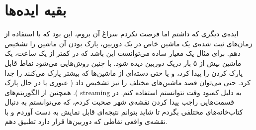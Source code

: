 \section{بقیه ایده‌ها}

ایده‌ی دیگری که داشتم اما فرصت نکردم سراغ آن بروم، این بود که با استفاده از زمان‌های ثبت شده‌ی یک ماشین خاص در یک دوربین، 
پارک بودن آن ماشین را تشخیص دهم. برای مثال یک معیار ساده می‌توانست این باشد که در کمتر از یک ساعت، یک ماشین بیش از ۵ بار دریک دوربین دیده شود. 
با چنین روش‌هایی می‌شود نقاط قابل پارک کردن را پیدا کرد، و یا حتی دسته‌ای از ماشین‌ها که بیشتر پارک می‌کنند را جدا کرد. حتی می‌توان قصد ماشین‌های مختلف را نیز تشخیص داد (
    عبوری یا در حال پارک
). همچنین از الگوریتم‌های 
streaming
به دلیل کمبود وقت نتوانستم استفاده کنم. در قسمت‌هایی راجب پیدا کردن نقشه‌ی شهر صحبت کردم، که می‌توانستم به دنبال کتاب‌خانه‌های مختلفی بگردم تا 
شاید بتوانم نتیجه‌ای قابل نمایش به دست آوردم و با نقشه‌ی واقعی نقاطی که دوربین‌ها قرار دارد تطبیق دهم. 